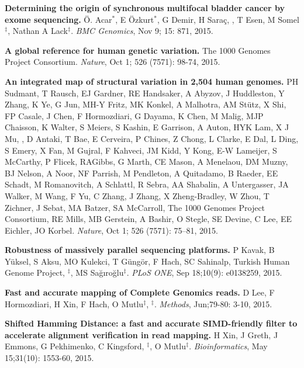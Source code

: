 \clearpage

\vspace{-.2cm}        
    {\bf Determining the origin of synchronous multifocal bladder cancer by exome sequencing.} 
    Ö. Acar$^\ast$, E Özkurt$^\ast$, G Demir, H Saraç, \calkan{}, T Esen, M Somel$^\ddag$, Nathan A Lack$^\ddag$.
    {\em BMC Genomics}, Nov 9; 15: 871, 2015.

\vspace{-.2cm}        
    {\bf A global reference for human genetic variation.} The 1000 Genomes Project Consortium.  {\em Nature}, Oct 1; 526 (7571): 98-74, 2015.


\vspace{-.2cm}        
    {\bf An integrated map of structural variation in 2,504 human genomes.}
    PH Sudmant, T Rausch, EJ Gardner,  RE Handsaker, A Abyzov, J Huddleston, Y Zhang, K Ye, G Jun, MH-Y Fritz, MK Konkel, A Malhotra, AM Stütz, X Shi, FP Casale, J Chen, F Hormozdiari, G Dayama, K Chen, M Malig, MJP Chaisson, K Walter, S Meiers, S Kashin, E Garrison, A Auton, HYK Lam, X J Mu, \calkan, D Antaki, T Bae, E Cerveira, P Chines, Z Chong, L Clarke, E Dal, L Ding, S Emery, X Fan, M Gujral, F Kahveci, JM Kidd, Y Kong, E-W Lameijer, S McCarthy, P Flicek, RAGibbs, G Marth, CE Mason, A Menelaou, DM Muzny, BJ Nelson, A Noor, NF Parrish, M Pendleton, A Quitadamo, B Raeder, EE Schadt, M Romanovitch, A Schlattl, R Sebra, AA Shabalin, A Untergasser, JA Walker, M Wang, F Yu, C Zhang, J Zhang, X Zheng-Bradley, W Zhou, T Zichner, J Sebat, MA Batzer, SA McCarroll, The 1000 Genomes Project Consortium, RE Mills, MB Gerstein, A Bashir, O Stegle, SE Devine, C Lee, EE Eichler, JO Korbel. 
    {\em Nature}, Oct 1; 526 (7571): 75–81, 2015.

\vspace{-.2cm}        
    {\bf Robustness of massively parallel sequencing platforms.}
    P Kavak, B Yüksel, S Aksu, MO Kulekci, T Güngör, F Hach, SC Sahinalp, Turkish Human Genome Project, \calkan{}$^\ddag$,
    MS Sağıroğlu$^\ddag$.    
    {\em PLoS ONE},  Sep 18;10(9): e0138259, 2015.  

\vspace{-.2cm}        
    {\bf Fast and accurate mapping of Complete Genomics reads.}
    D Lee, F Hormozdiari, H Xin, F Hach, O Mutlu$^\ddag$,  \calkan{}$^\ddag$.
    {\em Methods}, Jun;79-80: 3-10, 2015. 


\vspace{-.2cm}        
    {\bf Shifted Hamming Distance: a fast and accurate SIMD-friendly filter to accelerate alignment verification in read mapping.} H Xin, J Greth, J Emmons, 
    G Pekhimenko, C Kingsford, \calkan{}$^\ddag$,  O Mutlu$^\ddag$. {\em Bioinformatics},  May 15;31(10): 1553-60, 2015.

